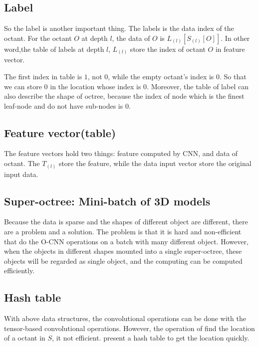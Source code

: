 \documentclass[border=0.5in]{blog}
\begin{document}
    \subsection{Label}
    \label{sec:o-cnn-ds:l}
    
    So the label is another important thing. The labels is the data index of the octant.
    For the octant $O$ at depth $l$, the data of $O$ is $L_{(l)}\left[S_{(l)}\left[O\right]\right]$.
    In other word,the table of labels at depth $l$, $L_(l)$ store the index of octant $O$ in feature vector.
    
    The first index in table is $1$, not $0$, while the empty octant's index is $0$.
    So that we can store $0$ in the location whose index is $0$.
    Moreover, the table of label can also describe the shape of octree,
    because the index of node which is the finest leaf-node and do not have sub-nodes is $0$.
    
    \subsection{Feature vector(table)}
    \label{sec:o-cnn-d:fv}
    
    The feature vectors hold two things: feature computed by CNN, and data of octant.
    The $T_{(l)}$ store the feature, while the data input vector store the original input data.
    
    \subsection{Super-octree: Mini-batch of 3D models}
    \label{sec:o-cnn-d:so}
    
    Because the data is sparse and the shapes of different object are different,
    there are a problem and a solution. The problem is that it is hard and non-efficient that
    do the O-CNN operations on a batch with many different object.
    However, when the objects in different shapes mounted into a single super-octree,
    these objects will be regarded as single object, and the computing can be computed efficiently.
    
    \subsection{Hash table}
    \label{sec:o-cnn-d:ht}
    
    With above data structures, the convolutional operations can be done with the tensor-based
    convolutional operations. However, the operation of find the location of a octant in $S$,
    it not efficient. \citep{DBLP:journals/tog/WangLGST17} present a hash table to get the location
    quickly.
    
\end{document}
